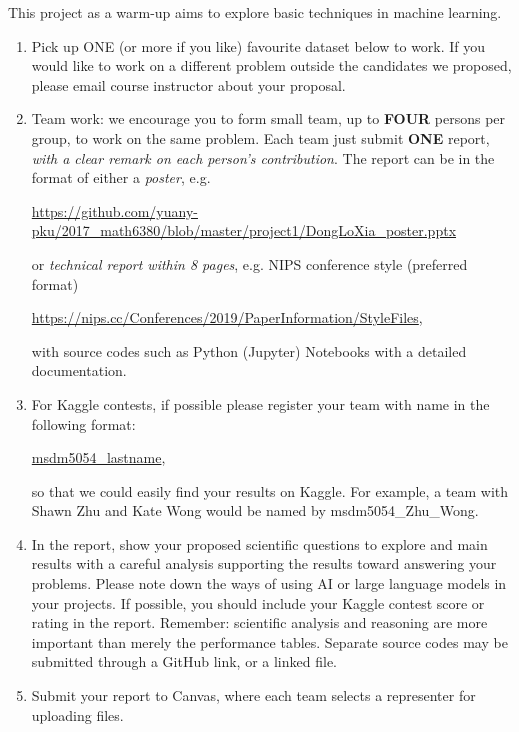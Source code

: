 \documentclass[11pt]{article}
\begin{document}
This project as a warm-up aims to explore basic techniques in machine learning.
\begin{enumerate}
\item Pick up ONE (or more if you like) favourite dataset below to work. If you would like to work on a different problem outside the candidates we proposed, please email course instructor about your proposal.  
\item Team work: we encourage you to form small team, up to {\bf FOUR} persons per group, to work on the same problem. Each team just submit {\bf ONE} report, \emph{with a clear remark on each person's contribution}. The report can be in the format of either a \emph{poster}, e.g. 
\begin{center}%
\url{https://github.com/yuany-pku/2017_math6380/blob/master/project1/DongLoXia_poster.pptx}
\end{center}
or \emph{technical report within 8 pages}, e.g. NIPS conference style (preferred format) 
\begin{center}
\url{https://nips.cc/Conferences/2019/PaperInformation/StyleFiles}, 
\end{center}
with source codes such as Python (Jupyter) Notebooks with a detailed documentation.
\item For Kaggle contests, if possible please register your team with name in the following format: \begin{center}{\url{msdm5054\_lastname}},\end{center} so that we could easily find your results on Kaggle. For example, a team with Shawn Zhu and Kate Wong would be named by msdm5054\_Zhu\_Wong.

\item In the report, show your proposed scientific questions to explore and main results with a careful analysis supporting the results toward answering your problems. Please note down the ways of using AI or large language models in your projects. If possible, you should include your Kaggle contest score or rating in the report. Remember: scientific analysis and reasoning are more important than merely the performance tables. Separate source codes may be submitted through a GitHub link, or a linked file.    

\item Submit your report to Canvas, where each team selects a representer for uploading files.  %


\end{enumerate}
\end{document}
